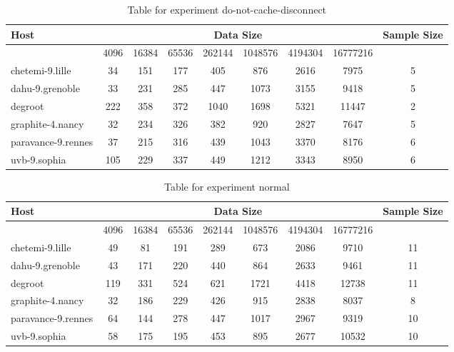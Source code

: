 \begin{table}
\caption{Table for experiment do-not-cache-disconnect}
\begin{tabular}{@{}lcccccccc@{}}
\toprule
Host    & \multicolumn{7}{c}{Data Size}          & Sample Size \\ \midrule
& 4096  & 16384  & 65536  & 262144  & 1048576  & 4194304  & 16777216              \\ \midrule
chetemi-9.lille  & 34  & 151  & 177  & 405  & 876  & 2616  & 7975  & 5 \\
dahu-9.grenoble  & 33  & 231  & 285  & 447  & 1073  & 3155  & 9418  & 5 \\
degroot  & 222  & 358  & 372  & 1040  & 1698  & 5321  & 11447  & 2 \\
graphite-4.nancy  & 32  & 234  & 326  & 382  & 920  & 2827  & 7647  & 5 \\
paravance-9.rennes  & 37  & 215  & 316  & 439  & 1043  & 3370  & 8176  & 6 \\
uvb-9.sophia  & 105  & 229  & 337  & 449  & 1212  & 3343  & 8950  & 6 \\
\bottomrule
\end{tabular}
\end{table}

\begin{table}
\caption{Table for experiment normal}
\begin{tabular}{@{}lcccccccc@{}}
\toprule
Host    & \multicolumn{7}{c}{Data Size}          & Sample Size \\ \midrule
& 4096  & 16384  & 65536  & 262144  & 1048576  & 4194304  & 16777216              \\ \midrule
chetemi-9.lille  & 49  & 81  & 191  & 289  & 673  & 2086  & 9710  & 11 \\
dahu-9.grenoble  & 43  & 171  & 220  & 440  & 864  & 2633  & 9461  & 11 \\
degroot  & 119  & 331  & 524  & 621  & 1721  & 4418  & 12738  & 11 \\
graphite-4.nancy  & 32  & 186  & 229  & 426  & 915  & 2838  & 8037  & 8 \\
paravance-9.rennes  & 64  & 144  & 278  & 447  & 1017  & 2967  & 9319  & 10 \\
uvb-9.sophia  & 58  & 175  & 195  & 453  & 895  & 2677  & 10532  & 10 \\
\bottomrule
\end{tabular}
\end{table}

